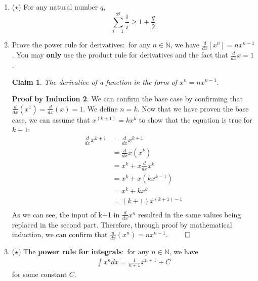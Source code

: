 \documentclass[11pt]{letter}
\newtheorem{claim}{Claim}
\theoremstyle{definition}
\newtheorem{PBI}{Proof by Induction}
\begin{document}
\begin{description}
\begin{enumerate}
\begin{PBI}
\begin{align*}
f_{n+1}=f_{n+1}
&=2^{k+1}\tag{used definition of f}\\
&=2(2^{k}) \\
&=2f_n \tag{Use inductive assumption} \\
\end{align*}
This confirms that $2^n$ accurately describes the probability of heads and tails. Through Mathematical Induction, we must conclude that given $n$ coin tosses, there are a total of $2^n$ possibilities. $\qed$
\end{PBI}
			\item ($\star$) For any natural number $q$, $$\sum_{i=1}^{2^q}\frac{1}{i}\geq 1+\frac{q}{2}$$
			\item Prove the power rule for derivatives:~for any $n\in\mathbb{N}$, we have $\frac{d}{dx}[x^n]=nx^{n-1}$. You may {\bfseries only} use the product rule for derivatives and the fact that $\frac{d}{dx}x=1$.
\begin{claim}
	The derivative of a function in the form of $x^n=nx^{n-1}$.
\end{claim}
\begin{PBI}
We can confirm the base case by confirming that $\frac{d}{dx}(x^1)=\frac{d}{dx}(x)=1$. We define $n=k$. Now that we have proven the base case, we can assume that $x^(k+1)=kx^{k}$ to show that the equation is true for $k+1$: 
\begin{align*}
\frac{d}{dx}x^{k+1}&=\frac{d}{dx}x^{k+1}\\
&= \frac{d}{dx}x(x^k) \\
&= x^k+x\frac{d}{dx}x^k  \tag{Applied product rule} \\
&= x^k+x(kx^{k-1}) \tag{Substituted with the inductive assumption} \\
&= x^k+kx^k \\
&= (k+1)x^{(k+1)-1} \\
\end{align*}
As we can see, the input of k+1 in $\frac{d}{dx}x^{n}$ resulted in the same values being replaced in the second part. Therefore, through proof by mathematical induction, we can confirm that $\frac{d}{dx}(x^n)=nx^{n-1}$. $\qed$
\end{PBI}
			 \item ($\star$) The {\bfseries power rule for integrals}:~for any $n\in\mathbb{N}$, we have 
				\begin{align*}
					\int x^ndx=\frac{1}{n+1}x^{n+1}+C
				\end{align*}
				for some constant $C$.\\

\end{enumerate}
\end{description}
\end{document}
